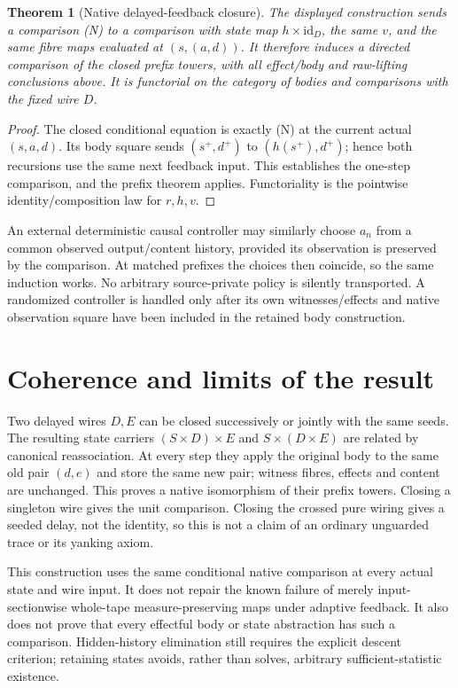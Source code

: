 \documentclass[11pt]{article}
\newtheorem{theorem}{Theorem}\newtheorem{proposition}{Proposition}\newtheorem{definition}{Definition}
\begin{document}
\begin{theorem}[Native delayed-feedback closure]
The displayed construction sends a comparison (N) to a comparison with state map $h\times\mathrm{id}_D$, the same $v$, and the same fibre maps evaluated at $(s,(a,d))$. It therefore induces a directed comparison of the closed prefix towers, with all effect/body and raw-lifting conclusions above. It is functorial on the category of bodies and comparisons with the fixed wire $D$.
\end{theorem}
\begin{proof}
The closed conditional equation is exactly (N) at the current actual $(s,a,d)$. Its body square sends $(s^+,d^+)$ to $(h(s^+),d^+)$; hence both recursions use the same next feedback input. This establishes the one-step comparison, and the prefix theorem applies. Functoriality is the pointwise identity/composition law for $r,h,v$.
\end{proof}

An external deterministic causal controller may similarly choose $a_n$ from a common observed output/content history, provided its observation is preserved by the comparison. At matched prefixes the choices then coincide, so the same induction works. No arbitrary source-private policy is silently transported. A randomized controller is handled only after its own witnesses/effects and native observation square have been included in the retained body construction.

\section{Coherence and limits of the result}
Two delayed wires $D,E$ can be closed successively or jointly with the same seeds. The resulting state carriers $(S\times D)\times E$ and $S\times(D\times E)$ are related by canonical reassociation. At every step they apply the original body to the same old pair $(d,e)$ and store the same new pair; witness fibres, effects and content are unchanged. This proves a native isomorphism of their prefix towers. Closing a singleton wire gives the unit comparison. Closing the crossed pure wiring gives a seeded delay, not the identity, so this is not a claim of an ordinary unguarded trace or its yanking axiom.

This construction uses the same conditional native comparison at every actual state and wire input. It does not repair the known failure of merely input-sectionwise whole-tape measure-preserving maps under adaptive feedback. It also does not prove that every effectful body or state abstraction has such a comparison. Hidden-history elimination still requires the explicit descent criterion; retaining states avoids, rather than solves, arbitrary sufficient-statistic existence.
\end{document}
